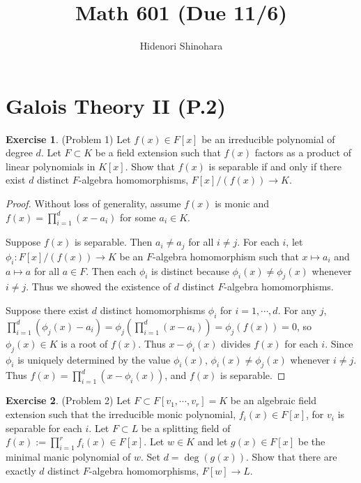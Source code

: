 \documentclass[12pt, psamsfonts]{amsart}
\theoremstyle{definition}
\newtheorem*{exer}{Exercise}
\theoremstyle{remark}
\numberwithin{equation}{section}
\begin{document}
\title{Math 601 (Due 11/6)}
\author{Hidenori Shinohara}
\maketitle

\tableofcontents

\section{Galois Theory II (P.2)}

\begin{exer}{(Problem 1)}
  Let $f(x) \in F[x]$ be an irreducible polynomial of degree $d$.
  Let $F \subset K$ be a field extension such that $f(x)$ factors as a product of linear polynomials in $K[x]$.
  Show that $f(x)$ is separable if and only if there exist $d$ distinct $F$-algebra homomorphisms, $F[x]/(f(x)) \rightarrow K$.
\end{exer}

\begin{proof}
  Without loss of generality, assume $f(x)$ is monic and $f(x) = \prod_{i=1}^{d} (x - a_i)$ for some $a_i \in K$.

  Suppose $f(x)$ is separable.
  Then $a_i \ne a_j$ for all $i \ne j$.
  For each $i$, let $\phi_i: F[x]/(f(x)) \rightarrow K$ be an $F$-algebra homomorphism such that $x \mapsto a_i$ and $a \mapsto a$ for all $a \in F$.
  Then each $\phi_i$ is distinct because $\phi_i(x) \ne \phi_j(x)$ whenever $i \ne j$.
  Thus we showed the existence of $d$ distinct $F$-algebra homomorphisms.

  Suppose there exist $d$ distinct homomorphisms $\phi_i$ for $i = 1, \cdots, d$.
  For any $j$, $\prod_{i=1}^{d}(\phi_j(x) - a_i) = \phi_j(\prod_{i=1}^{d}(x - a_i)) = \phi_j(f(x)) = 0$, so $\phi_j(x) \in K$ is a root of $f(x)$.
  Thus $x - \phi_i(x)$ divides $f(x)$ for each $i$.
  Since $\phi_i$ is uniquely determined by the value $\phi_i(x)$, $\phi_i(x) \ne \phi_j(x)$ whenever $i \ne j$.
  Thus $f(x) = \prod_{i=1}^{d}(x - \phi_i(x))$, and $f(x)$ is separable.
\end{proof}

\begin{exer}{(Problem 2)}
  Let $F \subset F[v_1, \cdots, v_r] = K$ be an algebraic field extension such that the irreducible monic polynomial, $f_i(x) \in F[x]$, for $v_i$ is separable for each $i$.
  Let $F \subset L$ be a splitting field of $f(x) := \prod_{i=1}^r f_i(x) \in F[x]$.
  Let $w \in K$ and let $g(x) \in F[x]$ be the minimal manic polynomial of $w$.
  Set $d = \deg(g(x))$.
  Show that there are exactly $d$ distinct $F$-algebra homomorphisms, $F[w] \rightarrow L$.
\end{exer}
\end{document}
